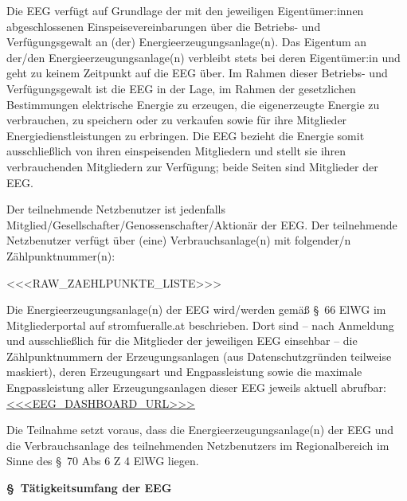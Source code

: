 \documentclass[a4paper,11pt]{article}
\newcounter{parasec}
\newcommand{\parasec}[1]{%
  \stepcounter{parasec}%
  \par\Needspace*{5\baselineskip}%
  \bigskip
  {\large\bfseries\color{tuerkis}\S\ \theparasec\quad #1}\par\nopagebreak
  \smallskip\nopagebreak
}
\begin{document}
Die EEG verfügt auf Grundlage der mit den jeweiligen Eigentümer:innen abgeschlossenen Einspeisevereinbarungen über die Betriebs- und Verfügungsgewalt an (der) Energieerzeugungsanlage(n). Das Eigentum an der/den Energieerzeugungsanlage(n) verbleibt stets bei deren Eigentümer:in und geht zu keinem Zeitpunkt auf die EEG über. Im Rahmen dieser Betriebs- und Verfügungsgewalt ist die EEG in der Lage, im Rahmen der gesetzlichen Bestimmungen elektrische Energie zu erzeugen, die eigenerzeugte Energie zu verbrauchen, zu speichern oder zu verkaufen sowie für ihre Mitglieder Energiedienstleistungen zu erbringen. Die EEG bezieht die Energie somit ausschließlich von ihren einspeisenden Mitgliedern und stellt sie ihren verbrauchenden Mitgliedern zur Verfügung; beide Seiten sind Mitglieder der EEG.

Der teilnehmende Netzbenutzer ist jedenfalls Mitglied/Gesellschafter/Genossenschafter/Aktionär der EEG. Der teilnehmende Netzbenutzer verfügt über (eine) Verbrauchsanlage(n) mit folgender/n Zählpunktnummer(n):

\medskip
\begin{itemize}
<<<RAW_ZAEHLPUNKTE_LISTE>>>
\end{itemize}
\medskip

Die Energieerzeugungsanlage(n) der EEG wird/werden gemäß \S\ 66 ElWG im Mitgliederportal auf stromfueralle.at beschrieben. Dort sind -- nach Anmeldung und ausschließlich für die Mitglieder der jeweiligen EEG einsehbar -- die Zählpunktnummern der Erzeugungsanlagen (aus Datenschutzgründen teilweise maskiert), deren Erzeugungsart und Engpassleistung sowie die maximale Engpassleistung aller Erzeugungsanlagen dieser EEG jeweils aktuell abrufbar: \url{<<<EEG_DASHBOARD_URL>>>}

Die Teilnahme setzt voraus, dass die Energieerzeugungsanlage(n) der EEG und die Verbrauchsanlage des teilnehmenden Netzbenutzers im Regionalbereich im Sinne des \S\ 70 Abs 6 Z 4 ElWG liegen.

\parasec{Tätigkeitsumfang der EEG}
\end{document}
